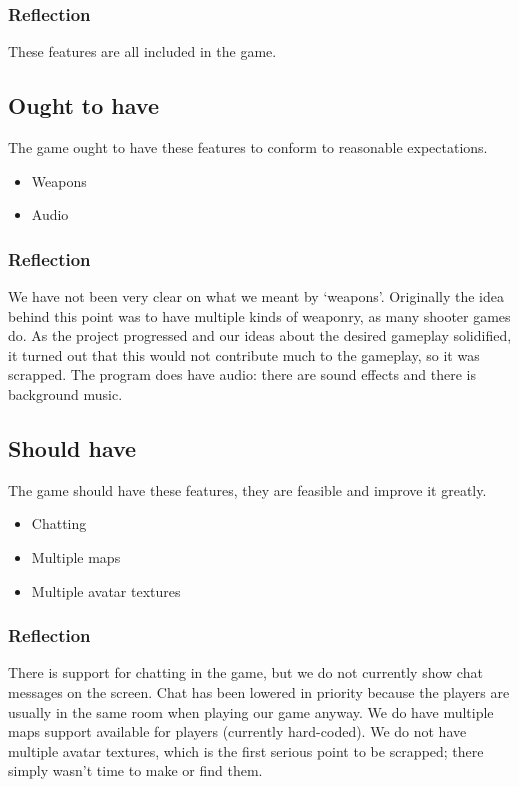 \subsubsection{Reflection}
These features are all included in the game.

\subsection{Ought to have} %
\label{sec:ought_to_have}
The game ought to have these features to conform to reasonable expectations.

\begin{itemize}
  \item Weapons
  \item Audio
\end{itemize}

\subsubsection{Reflection}
We have not been very clear on what we meant by  `weapons'. Originally the idea behind this point was to have multiple kinds of weaponry, as many shooter games do. As the project progressed and our ideas about the desired gameplay solidified, it turned out that this would not contribute much to the gameplay, so it was scrapped. The program does have audio: there are sound effects and there is background music.

\subsection{Should have} %
\label{sec:should_have}
The game should have these features, they are feasible and improve it greatly.

\begin{itemize}
  \item Chatting
  \item Multiple maps
  \item Multiple avatar textures
\end{itemize}

\subsubsection{Reflection}
There is support for chatting in the game, but we do not currently show chat messages on the screen. Chat  has been lowered in priority because the players are usually in the same room when playing our game anyway. We do have multiple maps support available for players (currently hard-coded). We do not have multiple avatar textures, which is the first serious point to be scrapped; there simply wasn't time to make or find them.

